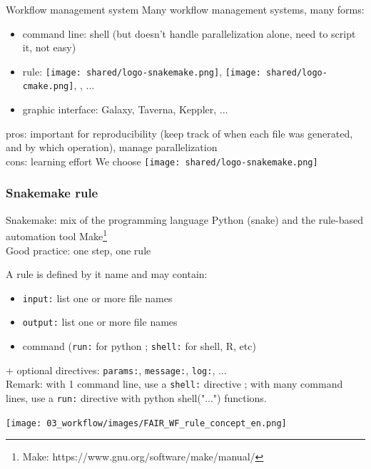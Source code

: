 \begin{frame}{Workflow management system}
Many workflow management systems, many forms:
\begin{itemize}
    \item command line: shell (but doesn't handle parallelization alone, need to script it, not easy)
    \item rule: \texttt{[image: shared/logo-snakemake.png]}, \texttt{[image: shared/logo-cmake.png]}, \logoNextflow, ...
    \item graphic interface: Galaxy, Taverna, Keppler, ...
\end{itemize}
\vfill
pros: important for reproducibility (keep track of when each file was generated, and by which operation), manage parallelization\\
cons: learning effort
\vfill
We choose \texttt{[image: shared/logo-snakemake.png]}
\end{frame}
\begin{frame}[containsverbatim]
\frametitle{Snakemake rule}
Snakemake: mix of the programming language Python (snake) and the rule-based automation tool Make\footnote{Make: https://www.gnu.org/software/make/manual/}\\
Good practice: one step, one rule
\begin{block}{A rule is defined by it name and may contain:}
\begin{itemize}
    \item \verb|input:| list one or more file names
    \item \verb|output:| list one or more file names
    \item command (\verb|run:| for python ; \verb|shell:| for shell, R, etc)
\end{itemize}
+ optional directives: \verb|params:|, \verb|message:|, \verb|log:|, ...\\
Remark: with 1 command line, use a \verb|shell:| directive ; with many command lines, use a \verb|run:| directive with python shell("...") functions.
\end{block}
\begin{center}
    \texttt{[image: 03\_workflow/images/FAIR\_WF\_rule\_concept\_en.png]}
\end{center}
\end{frame}
